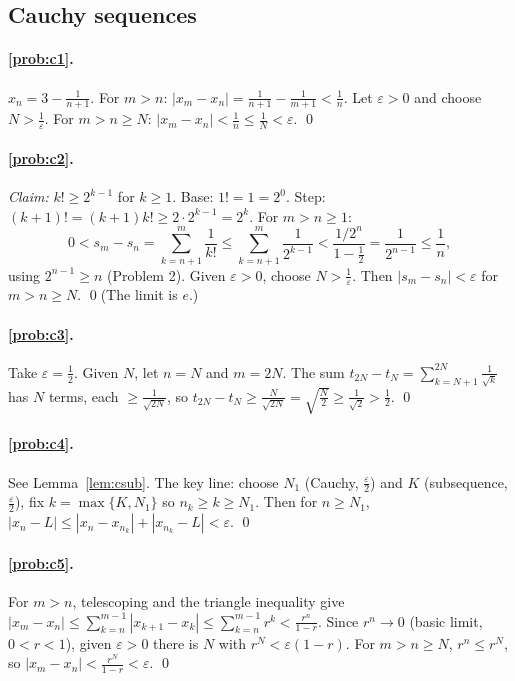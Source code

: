 \documentclass[11pt]{article}
\theoremstyle{definition}
\newcommand{\eps}{\varepsilon}
\begin{document}
\subsection*{Cauchy sequences}

\paragraph{\ref{prob:c1}.} $x_n=3-\frac1{n+1}$. For $m>n$:
$|x_m-x_n|=\frac1{n+1}-\frac1{m+1}<\frac1n$. Let $\eps>0$ and choose
$N>\frac1\eps$. For $m>n\ge N$: $|x_m-x_n|<\frac1n\le\frac1N<\eps$. \qed

\paragraph{\ref{prob:c2}.} \emph{Claim:} $k!\ge2^{k-1}$ for $k\ge1$.
Base: $1!=1=2^0$. Step: $(k+1)!=(k+1)k!\ge2\cdot2^{k-1}=2^k$. For
$m>n\ge1$:
\[
0<s_m-s_n=\sum_{k=n+1}^m\frac1{k!}\le\sum_{k=n+1}^m\frac1{2^{k-1}}
<\frac{1/2^n}{1-\frac12}=\frac1{2^{n-1}}\le\frac1n,
\]
using $2^{n-1}\ge n$ (Problem 2). Given $\eps>0$, choose $N>\frac1\eps$.
Then $|s_m-s_n|<\eps$ for $m>n\ge N$. \qed (The limit is $e$.)

\paragraph{\ref{prob:c3}.} Take $\eps=\frac12$. Given $N$, let $n=N$ and
$m=2N$. The sum $t_{2N}-t_N=\sum_{k=N+1}^{2N}\frac1{\sqrt k}$ has $N$
terms, each $\ge\frac1{\sqrt{2N}}$, so
$t_{2N}-t_N\ge\frac N{\sqrt{2N}}=\sqrt{\frac N2}\ge\frac1{\sqrt2}>\frac12$.
\qed

\paragraph{\ref{prob:c4}.} See Lemma~\ref{lem:csub}. The key line:
choose $N_1$ (Cauchy, $\frac\eps2$) and $K$ (subsequence, $\frac\eps2$),
fix $k=\max\{K,N_1\}$ so $n_k\ge k\ge N_1$. Then for $n\ge N_1$,
$|x_n-L|\le|x_n-x_{n_k}|+|x_{n_k}-L|<\eps$. \qed

\paragraph{\ref{prob:c5}.} For $m>n$, telescoping and the triangle
inequality give
$|x_m-x_n|\le\sum_{k=n}^{m-1}|x_{k+1}-x_k|\le\sum_{k=n}^{m-1}r^k<\frac{r^n}{1-r}$.
Since $r^n\to0$ (basic limit, $0<r<1$), given $\eps>0$ there is $N$ with
$r^N<\eps(1-r)$. For $m>n\ge N$, $r^n\le r^N$, so
$|x_m-x_n|<\frac{r^N}{1-r}<\eps$. \qed
\end{document}

